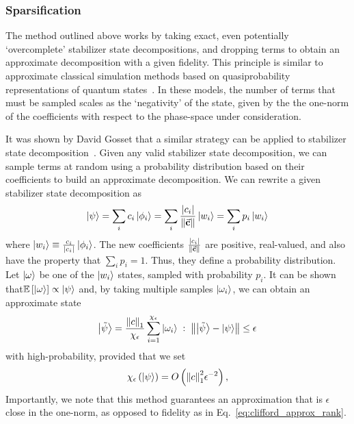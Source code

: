 \subsubsection*{Sparsification}
The method outlined above works by taking exact, even potentially `overcomplete' stabilizer state decompositions, and dropping terms to obtain an approximate decomposition with a given fidelity. This principle is similar to approximate classical simulation methods based on quasiprobability representations of quantum states~\cite{Pashayan2015}. In these models, the number of terms that must be sampled scales as the `negativity' of the state, given by the the one-norm of the coefficients with respect to the phase-space under consideration.\par
It was shown by David Gosset that a similar strategy can be applied to stabilizer state decomposition~\cite{Bravyi2018}. Given any valid stabilizer state decomposition, we can sample terms at random using a probability distribution based on their coefficients to build an approximate decomposition. We can rewrite a given stabilizer state decomposition as
\begin{equation}
\ket{\psi}=\sum_{i}c_{i}\ket{\phi_{i}} = \sum_{i}\frac{\left|c_{i}\right|}{\norm{\va{c}}}\ket{w_{i}} = \sum_{i}p_{i}\ket{w_{i}}
\end{equation}
where $\ket{w_{i}}\equiv \frac{c_{i}}{\left|c_{i}\right|}\ket{\phi_{i}}$. The new coefficients $\frac{\left|c_{i}\right|}{\norm{\va{c}}}$ are positive, real-valued, and also have the property that $\sum_{i}p_{i}=1$. Thus, they define a probability distribution. Let $\ket{\omega}$ be one of the $\ket{w_{i}}$ states, sampled with probability $p_{i}$. It can be shown that$\mathbb{E}\left[\ket{\omega}\right]\propto \ket{\psi}$ and, by taking multiple samples $\ket{\omega_{i}}$, we can obtain an approximate state
\begin{equation}
\ket{\tilde{\psi}} = \frac{\norm{c}_{1}}{\chi_{\epsilon}}\sum_{i=1}^{\chi_{\epsilon}}\ket{\omega_{i}}\;:\;\norm{\ket{\tilde{\psi}}-\ket{\psi}} \leq \epsilon 
\end{equation}
with high-probability, provided that we set~\cite{Bravyi2018}
\begin{equation}
\chi_{\epsilon}\left(\ket{\psi}\right) = O\left(\norm{c}_{1}^{2}\epsilon^{-2}\right),
\end{equation}
Importantly, we note that this method guarantees an approximation that is $\epsilon$ close in the one-norm, as opposed to fidelity as in Eq.~\ref{eq:clifford_approx_rank}.\par
